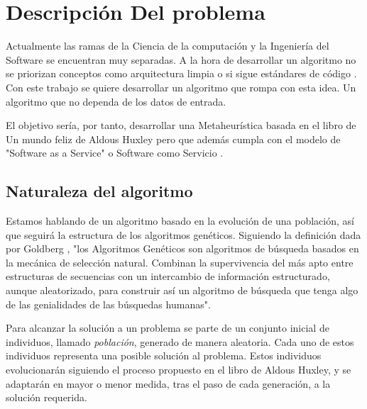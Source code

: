 \chapter{Descripción Del problema}

Actualmente las ramas de la Ciencia de la computación y la Ingeniería del Software se encuentran muy separadas. A la
hora de desarrollar un algoritmo no se priorizan conceptos como arquitectura limpia \cite{cleanArquitecture2017} o si 
sigue estándares de código \cite{cleanCode2008}. Con este trabajo se quiere desarrollar un algoritmo que rompa con esta idea. 
Un algoritmo que no dependa de los datos de entrada.

El objetivo sería, por tanto, desarrollar una Metaheurística basada en el libro de Un mundo feliz de Aldous
Huxley pero que además cumpla con el modelo de "Software as a Service" o Software como Servicio \cite{SaS}.

\section{Naturaleza del algoritmo}

Estamos hablando de un algoritmo basado en la evolución de una población, así que seguirá la estructura de los
algoritmos genéticos. Siguiendo la definición dada por Goldberg \cite{goldberg89}, "los Algoritmos Genéticos son algoritmos de búsqueda
basados en la mecánica de selección natural. Combinan la supervivencia del más apto entre estructuras de secuencias con un intercambio de 
información estructurado, aunque aleatorizado, para construir así un algoritmo
de búsqueda que tenga algo de las genialidades de las búsquedas humanas".

Para alcanzar la solución a un problema se parte de un conjunto inicial de individuos, llamado \textit{población},
generado de manera aleatoria. Cada uno de estos individuos representa una posible solución al problema. Estos individuos
evolucionarán siguiendo el proceso propuesto en el libro de Aldous Huxley, y se adaptarán en mayor o menor medida,
tras el paso de cada generación, a la solución requerida.



